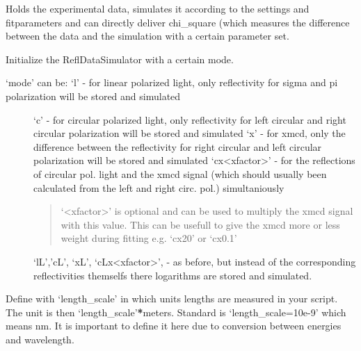\documentclass[letterpaper,10pt,english]{sphinxmanual}
\begin{document}
\begin{fulllineitems}
\label{\detokenize{modules-api/experiment:Experiment.ReflDataSimulator}}
Holds the experimental data, simulates it according to the settings and fitparameters and can directly deliver chi\_square (which measures the difference between the data and the simulation with a certain parameter set.

\begin{fulllineitems}
\label{\detokenize{modules-api/experiment:Experiment.ReflDataSimulator.__init__}}
Initialize the ReflDataSimulator with a certain mode.
\begin{description}
\item[{‘mode’ can be:    ‘l’             - for linear polarized light, only reflectivity for sigma and pi polarization will be stored and simulated}] \leavevmode
‘c’             - for circular polarized light, only reflectivity for left circular and right circular polarization will be stored and simulated
‘x’             - for xmcd, only the difference between the reflectivity for right circular and left circular polarization will be stored and simulated
‘cx\textless{}xfactor\textgreater{}’   - for the reflections of circular pol. light and the xmcd signal (which should usually been calculated from the left and right circ. pol.) simultaniously
\begin{quote}

‘\textless{}xfactor\textgreater{}’ is optional and can be used to multiply the xmcd signal with this value. This can be usefull to give the xmcd more or less weight during fitting
e.g.   ‘cx20’ or ‘cx0.1’
\end{quote}

‘lL’,’cL’,
‘xL’,
‘cLx\textless{}xfactor\textgreater{}’, - as before, but instead of the corresponding reflectivities themselfs there logarithms are stored and simulated.

\end{description}

Define with ‘length\_scale’ in which units lengths are measured in your script. The unit is then ‘length\_scale’{\color{red}\bfseries{}*}meters. Standard is ‘length\_scale=10e-9’ which means nm.
It is important to define it here due to conversion between energies and wavelength.


\end{fulllineitems}
\end{fulllineitems}
\end{document}
